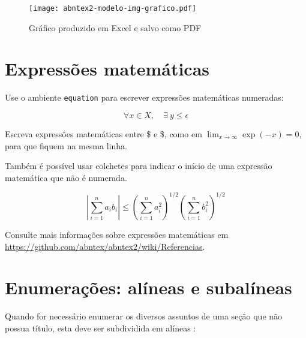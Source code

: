 \documentclass[
	12pt,				%
	openright,			%
	oneside,			    %
	a4paper,				%
	english,			%
	french,			%
	spanish,			%
	brazil			%
	]{abntex2}
\begin{document}
\begin{figure}[htb]
	\caption{\label{fig_grafico}Gráfico produzido em Excel e salvo como PDF}
	\begin{center}
	    \texttt{[image: abntex2-modelo-img-grafico.pdf]}
	\end{center}
\end{figure}


\section{Expressões matemáticas}

Use o ambiente \texttt{equation} para escrever
expressões matemáticas numeradas:

\begin{equation}
  \forall x \in X, \quad \exists \: y \leq \epsilon
\end{equation}

Escreva expressões matemáticas entre \$ e \$, como em $ \lim_{x \to \infty}
\exp(-x) = 0 $, para que fiquem na mesma linha.

Também é possível usar colchetes para indicar o início de uma expressão
matemática que não é numerada.

\[
\left|\sum_{i=1}^n a_ib_i\right|
\le
\left(\sum_{i=1}^n a_i^2\right)^{1/2}
\left(\sum_{i=1}^n b_i^2\right)^{1/2}
\]

Consulte mais informações sobre expressões matemáticas em
\url{https://github.com/abntex/abntex2/wiki/Referencias}.

\section{Enumerações: alíneas e subalíneas}

Quando for necessário enumerar
os diversos assuntos de uma seção que não possua título, esta deve ser
subdividida em alíneas \cite[4.2]{NBR6024:2012}:
\end{document}
